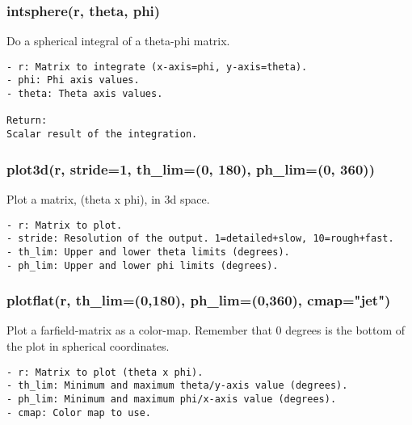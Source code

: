 \subsubsection{intsphere(r, theta, phi)}
Do a spherical integral of a theta-phi matrix.

\begin{verbatim}
- r: Matrix to integrate (x-axis=phi, y-axis=theta).
- phi: Phi axis values.
- theta: Theta axis values.

Return:
Scalar result of the integration.
\end{verbatim}

\subsubsection{plot3d(r, stride=1, th\_lim=(0, 180), ph\_lim=(0, 360))}
Plot a matrix, (theta x phi), in 3d space.

\begin{verbatim}
- r: Matrix to plot.
- stride: Resolution of the output. 1=detailed+slow, 10=rough+fast.
- th_lim: Upper and lower theta limits (degrees).
- ph_lim: Upper and lower phi limits (degrees).
\end{verbatim}

\subsubsection{plotflat(r, th\_lim=(0,180), ph\_lim=(0,360), cmap="jet")}
Plot a farfield-matrix as a color-map. Remember that 0 degrees is the bottom
of the plot in spherical coordinates.

\begin{verbatim}
- r: Matrix to plot (theta x phi).
- th_lim: Minimum and maximum theta/y-axis value (degrees).
- ph_lim: Minimum and maximum phi/x-axis value (degrees).
- cmap: Color map to use.
\end{verbatim}

